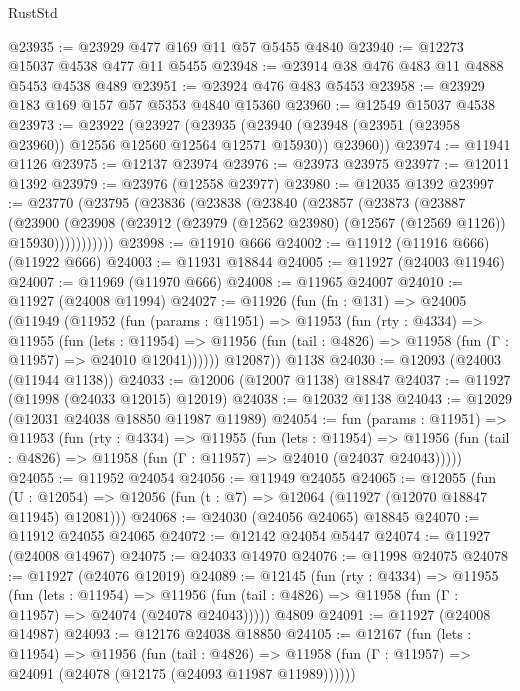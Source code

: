 \begin{lexlean}{RustStd}
\begin{coremodule}
@23935 := @23929 @477 @169 @11 @57 @5455 @4840
@23940 := @12273 @15037 @4538 @477 @11 @5455
@23948 := @23914 @38 @476 @483 @11 @4888 @5453 @4538 @489
@23951 := @23924 @476 @483 @5453
@23958 := @23929 @183 @169 @157 @57 @5353 @4840 @15360
@23960 := @12549 @15037 @4538
@23973 := @23922
    (@23927
      (@23935 (@23940 (@23948 (@23951 (@23958 @23960)) @12556 @12560 @12564 @12571 @15930)) @23960))
@23974 := @11941 @1126
@23975 := @12137 @23974
@23976 := @23973 @23975
@23977 := @12011 @1392
@23979 := @23976 (@12558 @23977)
@23980 := @12035 @1392
@23997 := @23770
    (@23795
      (@23836
        (@23838
          (@23840
            (@23857
              (@23873
                (@23887
                  (@23900
                    (@23908
                      (@23912 (@23979 (@12562 @23980) (@12567 (@12569 @1126)) @15930)))))))))))
@23998 := @11910 @666
@24002 := @11912 (@11916 @666) (@11922 @666)
@24003 := @11931 @18844
@24005 := @11927 (@24003 @11946)
@24007 := @11969 (@11970 @666)
@24008 := @11965 @24007
@24010 := @11927 (@24008 @11994)
@24027 := @11926
    (fun (fn : @131) =>
    @24005
      (@11949
        (@11952
          (fun (params : @11951) =>
          @11953
            (fun (rty : @4334) =>
            @11955
              (fun (lets : @11954) =>
              @11956 (fun (tail : @4826) => @11958 (fun (Γ : @11957) => @24010 @12041))))))
        @12087))
    @1138
@24030 := @12093 (@24003 (@11944 @1138))
@24033 := @12006 (@12007 @1138) @18847
@24037 := @11927 (@11998 (@24033 @12015) @12019)
@24038 := @12032 @1138
@24043 := @12029 (@12031 @24038 @18850 @11987 @11989)
@24054 := fun (params : @11951) =>
  @11953
    (fun (rty : @4334) =>
    @11955
      (fun (lets : @11954) =>
      @11956 (fun (tail : @4826) => @11958 (fun (Γ : @11957) => @24010 (@24037 @24043)))))
@24055 := @11952 @24054
@24056 := @11949 @24055
@24065 := @12055
    (fun (U : @12054) => @12056 (fun (t : @7) => @12064 (@11927 (@12070 @18847 @11945) @12081)))
@24068 := @24030 (@24056 @24065) @18845
@24070 := @11912 @24055 @24065
@24072 := @12142 @24054 @5447
@24074 := @11927 (@24008 @14967)
@24075 := @24033 @14970
@24076 := @11998 @24075
@24078 := @11927 (@24076 @12019)
@24089 := @12145
    (fun (rty : @4334) =>
    @11955
      (fun (lets : @11954) =>
      @11956 (fun (tail : @4826) => @11958 (fun (Γ : @11957) => @24074 (@24078 @24043)))))
    @4809
@24091 := @11927 (@24008 @14987)
@24093 := @12176 @24038 @18850
@24105 := @12167
    (fun (lets : @11954) =>
    @11956
      (fun (tail : @4826) =>
      @11958 (fun (Γ : @11957) => @24091 (@24078 (@12175 (@24093 @11987 @11989))))))

\end{coremodule}
\end{lexlean}
